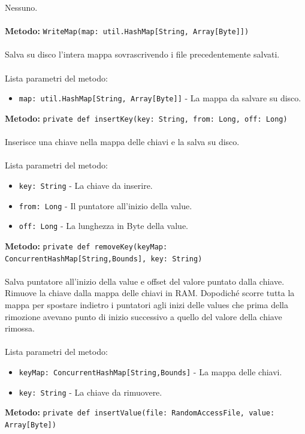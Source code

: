 \documentclass[a4paper]{article}
\begin{document}
		Nessuno.
		\\ \\
		\textbf{Metodo:} \texttt{WriteMap(map: util.HashMap[String, Array[Byte]])}
		\\ \\
		Salva su disco l'intera mappa sovrascrivendo i file precedentemente salvati.
		\\ \\
		Lista parametri del metodo:
		\begin{itemize}
			\item \texttt{map: util.HashMap[String, Array[Byte]]} - La mappa da salvare su disco. 
		\end{itemize}
		\textbf{Metodo:} \texttt{private def insertKey(key: String, from: Long, off: Long)}
		\\ \\
		Inserisce una chiave nella mappa delle chiavi e la salva su disco.
		\\ \\
		Lista parametri del metodo:
		\begin{itemize}
			\item \texttt{key: String} - La chiave da inserire.
			\item \texttt{from: Long} - Il puntatore all'inizio della value.
			\item \texttt{off: Long} - La lunghezza in Byte della value.
		\end{itemize}
		\textbf{Metodo:} \texttt{private def removeKey(keyMap: ConcurrentHashMap[String,Bounds], key: String)}
		\\ \\
		Salva puntatore all'inizio della value e offset del valore puntato dalla chiave. Rimuove la chiave dalla mappa delle chiavi in RAM. Dopodiché scorre tutta la mappa per spostare indietro i puntatori agli inizi delle values che prima della rimozione avevano punto di inizio successivo a quello del valore della chiave rimossa.
		\\ \\
		Lista parametri del metodo:
		\begin{itemize}
			\item \texttt{keyMap: ConcurrentHashMap[String,Bounds]} - La mappa delle chiavi.
			\item \texttt{key: String} - La chiave da rimuovere.
		\end{itemize}
		\textbf{Metodo:} \texttt{private def insertValue(file: RandomAccessFile, value: Array[Byte])}
		\\ \\
\end{document}
